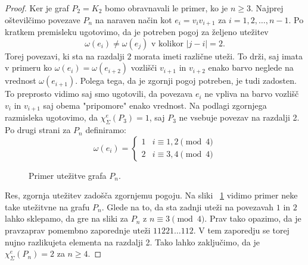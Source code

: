 \documentclass[12pt,a4paper,twoside]{article}
\theoremstyle{definition} %
\theoremstyle{plain} %
\newcommand{\ec}{\chi_{\Sigma}^e}
\numberwithin{equation}{section}  %
\begin{document}
\begin{proof}
	Ker je graf $P_2 = K_2$ bomo obravnavali le primer, ko je $n \ge 3$. Najprej oštevilčimo povezave $P_n$ na naraven način kot $e_i = v_i v_{i+1}$ za $i=1,2,\ldots, n-1$. Po kratkem premisleku ugotovimo, da je potreben pogoj za željeno utežitev
	$$\omega(e_i) \neq \omega(e_j) \text{ v kolikor } |j-i| = 2 .$$
	Torej povezavi, ki sta na razdalji $2$ morata imeti različne uteži. To drži, saj imata v primeru ko $\omega(e_i) = \omega(e_{i+2})$ vozlišči $v_{i+1}$ in $v_{i+2}$ enako barvo neglede na vrednost $\omega(e_{i+1})$. Polega tega, da je zgornji pogoj potreben, je tudi zadosten. To preprosto vidimo saj smo ugotovili, da povezava $e_{i}$ ne vpliva na barvo vozlišč $v_i$ in $v_{i+1}$ saj obema "pripomore" enako vrednost. Na podlagi zgornjega razmisleka ugotovimo, da $\ec(P_3) = 1$, saj $P_3$ ne vsebuje povezav na razdalji 2. Po drugi strani za $P_n$ definiramo:
	\begin{equation*}
	\omega(e_i) = \begin{cases}
			1 &i \equiv 1,2 \pmod{4}\\ 
			2 &i \equiv 3,4 \pmod{4}
	\end{cases}
	\end{equation*}
	
	\begin{figure}[!h]
		\centering
		\label{pn}
		\caption{Primer utežitve grafa $P_n$.}
	\end{figure}
	Res, zgornja utežitev zadošča zgornjemu pogoju. Na sliki ~\ref{pn} vidimo primer neke take utežitvne na grafu $P_n$. Glede na to, da sta zadnji uteži na povezavah $1$ in $2$ lahko sklepamo, da gre na sliki za $P_n$ z $n \equiv 3 \pmod{4}$. Prav tako opazimo, da je pravzaprav pomembno zaporednje uteži $11221\ldots 112$. V tem zaporedju se torej nujno razlikujeta elementa na razdalji 2. Tako lahko zaključimo, da je $\ec(P_n) = 2$ za $n \ge 4$. 


\end{proof}
\end{document}
